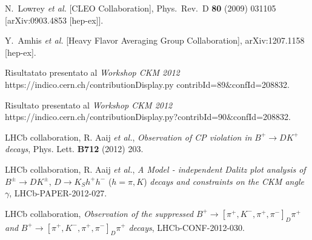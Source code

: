 \begin{thebibliography}{10}
  N.~Lowrey {\it et al.}  [CLEO Collaboration], Phys.\ Rev.\ D {\bf 80} (2009) 031105 [arXiv:0903.4853 [hep-ex]].

 Y.~Amhis {\it et al.}  [Heavy Flavor Averaging Group Collaboration], arXiv:1207.1158 [hep-ex].

 Risultatato presentato al \emph{Workshop CKM 2012} \\https://indico.cern.ch/contributionDisplay.py contribId=89$\&$confId=208832.

Risultato presentato al \emph{Workshop CKM 2012} \\https://indico.cern.ch/contributionDisplay.py?contribId=90$\&$confId=208832.

LHCb collaboration, R. Aaij \emph{et al.}, \emph{Observation of CP violation in} $B^+\rightarrow DK^+$ \emph{decays}, Phys. Lett. \textbf{B712} (2012) 203.

LHCb collaboration, R. Aaij \emph{et al.}, \emph{A Model - independent Dalitz plot analysis of} $B^{\pm}\rightarrow DK^{\pm} $, $D\rightarrow K_Sh^+h^-$ ($h = \pi, K$) \emph{decays and constraints on the CKM angle $\gamma$}, LHCb-PAPER-2012-027.

LHCb collaboration, \emph{Observation of the suppressed} $B^+\rightarrow [\pi^+, K^-, \pi^+, \pi^-]_D \pi^+$ \emph{and} $B^+\rightarrow [\pi^+, K^-, \pi^+, \pi^-]_D \pi^+$ \emph{decays},  LHCb-CONF-2012-030.


\end{thebibliography}
